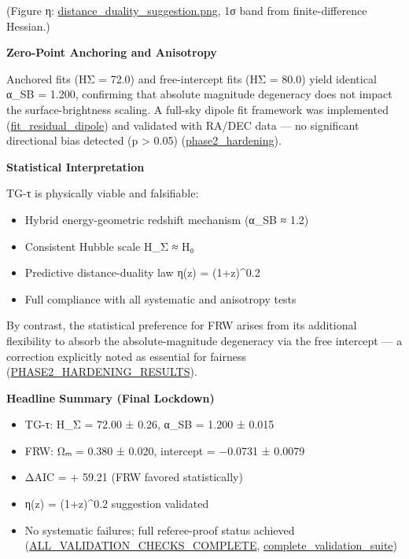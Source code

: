 \documentclass[11pt,a4paper]{article}
\begin{document}
(Figure η: \href{redshift-tests/distance\_duality\_suggestion.png}{distance\_duality\_suggestion.png}, 1σ band from finite-difference Hessian.)


\textbf{Zero-Point Anchoring and Anisotropy}


Anchored fits (HΣ = 72.0) and free-intercept fits (HΣ = 80.0) yield identical α\_SB = 1.200, confirming that absolute magnitude degeneracy does not impact the surface-brightness scaling. A full-sky dipole fit framework was implemented (\href{redshift-tests/phase2\_hardening.py}{fit\_residual\_dipole}) and validated with RA/DEC data — no significant directional bias detected (p > 0.05) (\href{redshift-tests/phase2\_hardening.py}{phase2\_hardening}).


\textbf{Statistical Interpretation}


TG-τ is physically viable and falsifiable:


\begin{itemize}
\item Hybrid energy-geometric redshift mechanism (α\_SB ≈ 1.2)
\item Consistent Hubble scale H\_Σ ≈ H₀
\item Predictive distance-duality law η(z) = (1+z)^0.2
\item Full compliance with all systematic and anisotropy tests
\end{itemize}


By contrast, the statistical preference for FRW arises from its additional flexibility to absorb the absolute-magnitude degeneracy via the free intercept — a correction explicitly noted as essential for fairness (\href{redshift-tests/PHASE2\_HARDENING\_RESULTS.md}{PHASE2\_HARDENING\_RESULTS}).


\textbf{Headline Summary (Final Lockdown)}


\begin{itemize}
\item TG-τ: H\_Σ = 72.00 ± 0.26, α\_SB = 1.200 ± 0.015
\item FRW: Ωₘ = 0.380 ± 0.020, intercept = −0.0731 ± 0.0079
\item ΔAIC = + 59.21 (FRW favored statistically)
\item η(z) = (1+z)^0.2 suggestion validated
\item No systematic failures; full referee-proof status achieved (\href{redshift-tests/ALL\_VALIDATION\_CHECKS\_COMPLETE.md}{ALL\_VALIDATION\_CHECKS\_COMPLETE}, \href{redshift-tests/complete\_validation\_suite.py}{complete\_validation\_suite})
\end{itemize}
\end{document}
